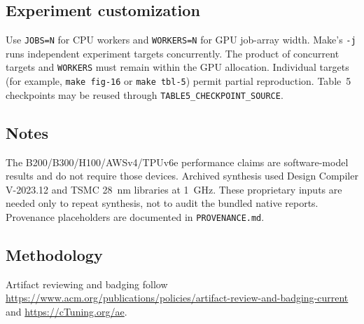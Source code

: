 \documentclass{sigplanconf}
\begin{document}
\subsection{Experiment customization}

Use \texttt{JOBS=N} for CPU workers and \texttt{WORKERS=N} for GPU job-array
width.  Make's \texttt{-j} runs independent experiment targets concurrently.
The product of concurrent targets and \texttt{WORKERS} must remain within the
GPU allocation.
Individual targets (for example, \texttt{make fig-16} or \texttt{make tbl-5})
permit partial reproduction.  Table~5 checkpoints may be reused through
\texttt{TABLE5\_CHECKPOINT\_SOURCE}.

\subsection{Notes}

The B200/B300/H100/AWSv4/TPUv6e performance claims are software-model results
and do not require those devices.  Archived synthesis used Design Compiler
V-2023.12 and TSMC 28~nm libraries at 1~GHz.  These proprietary inputs are
needed only to repeat synthesis, not to audit the bundled native reports.
Provenance placeholders are documented in \texttt{PROVENANCE.md}.

\subsection{Methodology}

Artifact reviewing and badging follow
\url{https://www.acm.org/publications/policies/artifact-review-and-badging-current}
and \url{https://cTuning.org/ae}.
\end{document}
